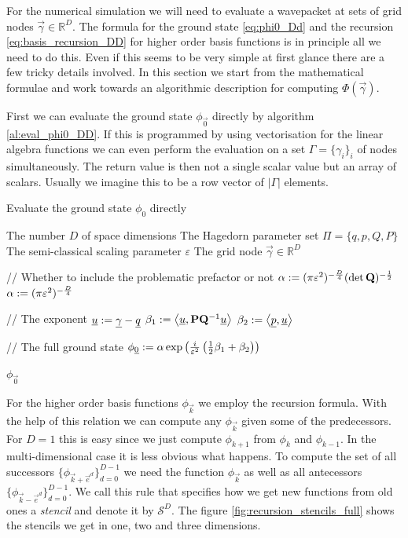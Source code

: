 For the numerical simulation we will need to evaluate a wavepacket at sets of
grid nodes $\vec{\gamma} \in \mathbb{R}^D$. The formula for the ground state
\eqref{eq:phi0_Dd} and the recursion \eqref{eq:basis_recursion_DD} for higher
order basis functions is in principle all we need to do this. Even if this
seems to be very simple at first glance there are a few tricky details involved.
In this section we start from the mathematical formulae and work towards an
algorithmic description for computing $\Phi(\vec{\gamma})$.

First we can evaluate the ground state $\phi_{\vec{0}}$ directly by algorithm \ref{al:eval_phi0_DD}.
If this is programmed by using vectorisation for the linear algebra functions we
can even perform the evaluation on a set $\Gamma = \{\gamma_i\}_i$ of nodes simultaneously.
The return value is then not a single scalar value but an array of scalars.
Usually we imagine this to be a row vector of $|\Gamma|$ elements.

\begin{algorithm}
\caption{Evaluate the ground state $\phi_0$ directly}
\label{al:eval_phi0_DD}
\begin{algorithmic}
  \REQUIRE The number $D$ of space dimensions
  \REQUIRE The Hagedorn parameter set $\Pi = \{q,p,Q,P\}$
  \REQUIRE The semi-classical scaling parameter $\varepsilon$
  \REQUIRE The grid node $\vec{\gamma} \in \mathbb{R}^D$

  \STATE // Whether to include the problematic prefactor or not
    \STATE $\alpha := (\pi\varepsilon^2)^{-\frac{D}{4}} (\det\mathbf{Q})^{-\frac{1}{2}}$
  \ELSE
    \STATE $\alpha := (\pi\varepsilon^2)^{-\frac{D}{4}}$
  \ENDIF

  \STATE // The exponent
  \STATE $\underline{u} := \underline{\gamma}-\underline{q}$
  \STATE $\beta_1 := \left\langle \underline{u} , \mathbf{P}\mathbf{Q}{}^{-1}\underline{u} \right\rangle$
  \STATE $\beta_2 := \left\langle \underline{p} , \underline{u} \right\rangle$

  \STATE // The full ground state
  \STATE $\phi_{\underline{0}} := \alpha \exp\left(\frac{i}{\varepsilon^2}\left(\frac{1}{2}\beta_1 + \beta_2\right)\right)$

  \RETURN $\phi_{\vec{0}}$
\end{algorithmic}
\end{algorithm}

For the higher order basis functions $\phi_{\vec{k}}$ we employ the recursion
formula. With the help of this relation we can compute any $\phi_{\vec{k}}$
given some of the predecessors. For $D=1$ this is easy since we just compute
$\phi_{k+1}$ from $\phi_k$ and $\phi_{k-1}$. In the multi-dimensional case
it is less obvious what happens. To compute the set of all successors $\{\phi_{\vec{k}+\vec{e}^d}\}_{d=0}^{D-1}$
we need the function $\phi_{\vec{k}}$ as well as all antecessors $\{\phi_{\vec{k}-\vec{e}^d}\}_{d=0}^{D-1}$.
We call this rule that specifies how we get new functions from old ones a \emph{stencil}
and denote it by $\mathcal{S}^D$. The figure \ref{fig:recursion_stencils_full}
shows the stencils we get in one, two and three dimensions.

